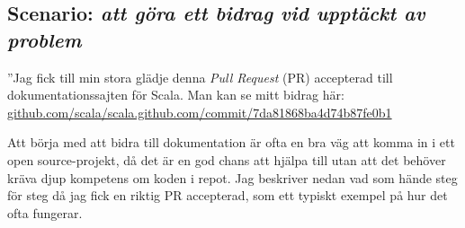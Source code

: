 \subsection*{Scenario: \emph{att göra ett bidrag vid upptäckt av problem}}

''Jag fick till min stora glädje denna \emph{Pull Request} (PR) accepterad till dokumentationssajten för Scala. Man kan se mitt bidrag här:\\
\href{https://github.com/scala/scala.github.com/commit/7da81868ba4d74b87fe0b19478d3ae9a3019d80d}{github.com/scala/scala.github.com/commit/7da81868ba4d74b87fe0b1} 

Att börja med att bidra till dokumentation är ofta en bra väg att komma in i ett open source-projekt, då det är en god chans att hjälpa till utan att det behöver kräva djup kompetens om koden i repot. Jag beskriver nedan vad som hände steg för steg då jag fick en riktig PR accepterad, som ett typiskt exempel på hur det ofta fungerar.

